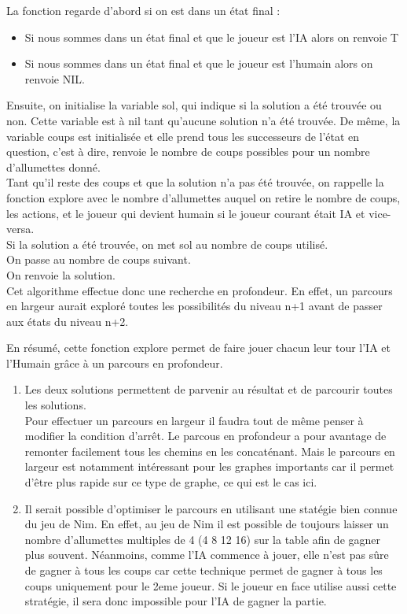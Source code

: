 \documentclass[
]{article}
\begin{document}
La fonction regarde d'abord si on est dans un état final :
\begin{itemize}
    \item Si nous sommes dans un état final et que le joueur est l'IA alors on renvoie T 
    \item Si nous sommes dans un état final et que le joueur est l'humain alors on renvoie NIL.
\end{itemize}

Ensuite, on initialise la variable sol, qui indique si la solution a été
trouvée ou non. Cette variable est à nil tant qu'aucune solution n'a été
trouvée. De même, la variable coups est initialisée et elle prend tous
les successeurs de l'état en question, c'est à dire, renvoie le nombre
de coups possibles pour un nombre d'allumettes donné.\\
Tant qu'il reste des coups et que la solution n'a pas été trouvée, on
rappelle la fonction explore avec le nombre d'allumettes auquel on
retire le nombre de coups, les actions, et le joueur qui devient humain
si le joueur courant était IA et vice-versa.\\
Si la solution a été trouvée, on met sol au nombre de coups utilisé.\\
On passe au nombre de coups suivant.\\
On renvoie la solution.\\
Cet algorithme effectue donc une recherche en profondeur. En effet, un
parcours en largeur aurait exploré toutes les possibilités du niveau n+1
avant de passer aux états du niveau n+2.

En résumé, cette fonction explore permet de faire jouer chacun leur tour
l'IA et l'Humain grâce à un parcours en profondeur.

\begin{enumerate}
\def\labelenumi{\arabic{enumi}.}
\setcounter{enumi}{3}
\item
  Les deux solutions permettent de parvenir au résultat et de parcourir
  toutes les solutions.\\
  Pour effectuer un parcours en largeur il faudra tout de même penser à
  modifier la condition d'arrêt. Le parcous en profondeur a pour
  avantage de remonter facilement tous les chemins en les concaténant.
  Mais le parcours en largeur est notamment intéressant pour les graphes
  importants car il permet d'être plus rapide sur ce type de graphe, ce
  qui est le cas ici.
\item
  Il serait possible d'optimiser le parcours en utilisant une statégie
  bien connue du jeu de Nim. En effet, au jeu de Nim il est possible de
  toujours laisser un nombre d'allumettes multiples de 4 (4 8 12 16) sur
  la table afin de gagner plus souvent. Néanmoins, comme l'IA commence à
  jouer, elle n'est pas sûre de gagner à tous les coups car cette
  technique permet de gagner à tous les coups uniquement pour le 2eme
  joueur. Si le joueur en face utilise aussi cette stratégie, il sera
  donc impossible pour l'IA de gagner la partie.
\end{enumerate}
\end{document}
